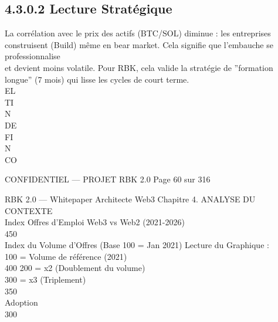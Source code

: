 \documentclass[12pt,landscape,a4paper]{article}
\newenvironment{confidential}
{\begin{tcolorbox}[
    colback=rbkred!5!white,
    colframe=rbkred!75!black,
    title=CONFIDENTIEL,
    fonttitle=\bfseries\color{white},
    coltitle=rbkred!75!black,
    breakable,
    enhanced,
    frame hidden,
    borderline west={2pt}{0pt}{rbkred!75!black}
]}
{\end{tcolorbox}}
\begin{document}
\subsection{4.3.0.2 Lecture Stratégique}
La corrélation avec le prix des actifs (BTC/SOL) diminue : les entreprises construisent (Build) même en bear market. Cela signifie que l’embauche se professionnalise\\
et devient moins volatile. Pour RBK, cela valide la stratégie de ”formation longue” (7 mois) qui lisse les cycles de court terme.\\
\vspace{0.5em}
\vspace{0.5em}
\vspace{0.5em}
\vspace{0.5em}
EL\\
TI\\
N\\
DE\\
FI\\
N\\
CO\\
\vspace{0.5em}
\vspace{0.5em}
\vspace{0.5em}
\vspace{0.5em}
\begin{confidential}CONFIDENTIEL — PROJET RBK 2.0                                              Page 60 sur 316\end{confidential}
RBK 2.0 — Whitepaper Architecte Web3                                                                                                                                            Chapitre 4. ANALYSE DU CONTEXTE\\
\vspace{0.5em}
\vspace{0.5em}
Index Offres d’Emploi Web3 vs Web2 (2021-2026)\\
450\\
Index du Volume d’Offres (Base 100 = Jan 2021)           Lecture du Graphique :\\
100 = Volume de référence (2021)\\
400     200 = x2 (Doublement du volume)\\
300 = x3 (Triplement)\\
\vspace{0.5em}
350\\
\vspace{0.5em}
Adoption\\
300\\
\end{document}

